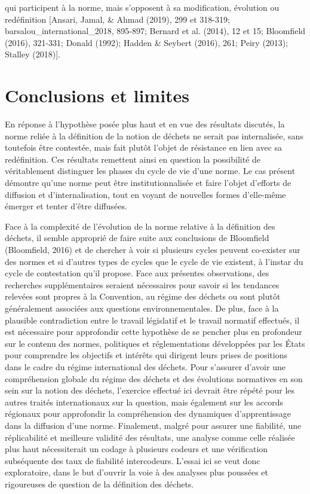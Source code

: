 \documentclass[12pt]{ulaval}
\begin{document}
qui participent à la norme, mais s'opposent à sa modification, évolution ou redéfinition {[}Ansari, Jamal, \& Ahmad (2019), 299 et 318-319; barsalou\_international\_2018, 895-897; Bernard et al. (2014), 12 et 15; Bloomfield (2016), 321-331; Donald (1992); Hadden \& Seybert (2016), 261; Peiry (2013); Stalley (2018){]}.

\section{Conclusions et limites}\label{conclusions-et-limites}

En réponse à l'hypothèse posée plus haut et en vue des résultats discutés, la norme reliée à la définition de la notion de déchets ne serait pas internalisée, sans toutefois être contestée, mais fait plutôt l'objet de résistance en lien avec sa redéfinition. Ces résultats remettent ainsi en question la possibilité de véritablement distinguer les phases du cycle de vie d'une norme. Le cas présent démontre qu'une norme peut être institutionnalisée et faire l'objet d'efforts de diffusion et d'internalisation, tout en voyant de nouvelles formes d'elle-même émerger et tenter d'être diffusées.

Face à la complexité de l'évolution de la norme relative à la définition des déchets, il semble approprié de faire suite aux conclusions de Bloomfield (Bloomfield, 2016) et de chercher à voir si plusieurs cycles peuvent co-exister sur des normes et si d'autres types de cycles que le cycle de vie existent, à l'instar du cycle de contestation qu'il propose. Face aux présentes observations, des recherches supplémentaires seraient nécessaires pour savoir si les tendances relevées sont propres à la Convention, au régime des déchets ou sont plutôt généralement associées aux questions environnementales. De plus, face à la plausible contradiction entre le travail législatif et le travail normatif effectués, il est nécessaire pour approfondir cette hypothèse de se pencher plus en profondeur sur le contenu des normes, politiques et réglementations développées par les États pour comprendre les objectifs et intérêts qui dirigent leurs prises de positions dans le cadre du régime international des déchets. Pour s'assurer d'avoir une compréhension globale du régime des déchets et des évolutions normatives en son sein sur la notion des déchets, l'exercice effectué ici devrait être répété pour les autres traités internationaux sur la question, mais également sur les accords régionaux pour approfondir la compréhension des dynamiques d'apprentissage dans la diffusion d'une norme. Finalement, malgré pour assurer une fiabilité, une réplicabilité et meilleure validité des résultats, une analyse comme celle réalisée plus haut nécessiterait un codage à plusieurs codeurs et une vérification subséquente des taux de fiabilité intercodeurs. L'essai ici se veut donc exploratoire, dans le but d'ouvrir la voie à des analyses plus poussées et rigoureuses de question de la définition des déchets.
\end{document}
